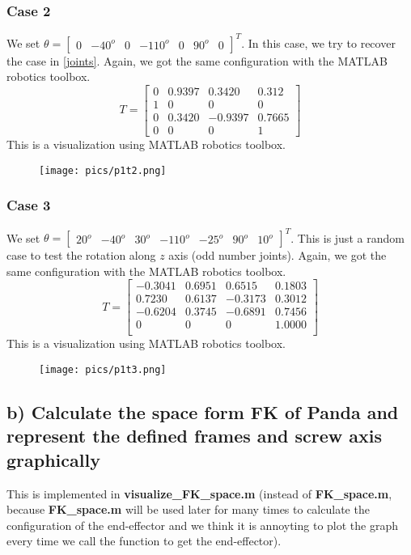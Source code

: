 \documentclass[english,10pt,a4paper]{book}
\begin{document}
    \subsubsection*{Case 2}
    We set $\theta = \begin{bmatrix}
        0 & -40^o & 0 & -110^o & 0 & 90^o & 0
    \end{bmatrix}^T$. In this case, we try to recover the case in \ref{joints}. Again, we got the same configuration with the MATLAB robotics toolbox.
    $$T = \begin{bmatrix}
        0 & 0.9397 & 0.3420 & 0.312 \\ 1 & 0 & 0 & 0\\ 0 & 0.3420 & -0.9397 & 0.7665\\ 0 & 0 & 0 & 1
    \end{bmatrix}$$
    This is a visualization using MATLAB robotics toolbox.
    \begin{figure}[H]
        \texttt{[image: pics/p1t2.png]}
    \end{figure}
    
    \subsubsection*{Case 3}
    We set $\theta = \begin{bmatrix}
        20^o & -40^o & 30^o & -110^o & -25^o & 90^o & 10^o
    \end{bmatrix}^T$. This is just a random case to test the rotation along $z$ axis (odd number joints). Again, we got the same configuration with the MATLAB robotics toolbox.
    $$T = \begin{bmatrix}
           -0.3041 &   0.6951  & 0.6515  &  0.1803 \\
        0.7230 &   0.6137 &  -0.3173  &  0.3012\\
        -0.6204  &  0.3745  & -0.6891  &  0.7456\\
        0      &   0     &    0  &  1.0000\\
    \end{bmatrix}$$
    This is a visualization using MATLAB robotics toolbox.
    \begin{figure}[H]
        \texttt{[image: pics/p1t3.png]}
    \end{figure}
	
    \subsection*{b) Calculate the space form FK of Panda and represent the defined frames and screw axis graphically}
    This is implemented in \textbf{visualize\_FK\_space.m} (instead of \textbf{FK\_space.m}, because \textbf{FK\_space.m} will be used later for many times to calculate the configuration of the end-effector and we think it is annoyting to plot the graph every time we call the function to get the end-effector).
	
\end{document}
